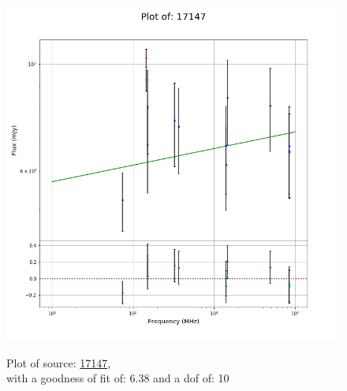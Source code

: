 \documentclass{article}
\begin{document}
\begin{figure}[H]
    \centering
    \begin{minipage}{.5\textwidth}
        \centering
        \includegraphics[scale = 0.35]{KmeulenTrap4P23_1min/1min17147.png}
        \captionsetup{labelformat=empty}
        \caption{Plot of source: \href{http://banana.transientskp.org/r4/vlo_KmeulenTrap4P23/runningcatalog/17147}{17147},\\with a goodness of fit of: 6.38 and a dof of: 10}
        \addtocounter{figure}{-1}
        \label{KmeulenTrap4P23:1min:17147:plot}
    \end{minipage}%
    \begin{minipage}{0.5\textwidth}
        \centering


\end{minipage}
\end{figure}
\end{document}
